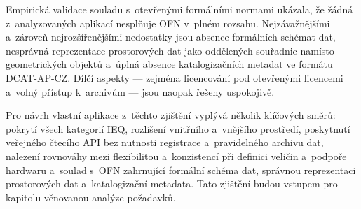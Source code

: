 Empirická validace souladu s~otevřenými formálními normami ukázala, že žádná z~analyzovaných aplikací nesplňuje OFN v~plném rozsahu. Nejzávažnějšími a~zároveň nejrozšířenějšími nedostatky jsou absence formálních schémat dat, nesprávná reprezentace prostorových dat jako oddělených souřadnic namísto geometrických objektů a~úplná absence katalogizačních metadat ve formátu DCAT-AP-CZ. Dílčí aspekty --- zejména licencování pod otevřenými licencemi a~volný přístup k~archivům --- jsou naopak řešeny uspokojivě.

Pro návrh vlastní aplikace z~těchto zjištění vyplývá několik klíčových směrů: pokrytí všech kategorií IEQ, rozlišení vnitřního a~vnějšího prostředí, poskytnutí veřejného čtecího API bez nutnosti registrace a~pravidelného archivu dat, nalezení rovnováhy mezi flexibilitou a~konzistencí při definici veličin a~podpoře hardwaru a~soulad s~OFN zahrnující formální schéma dat, správnou reprezentaci prostorových dat a~katalogizační metadata. Tato zjištění budou vstupem pro kapitolu věnovanou analýze požadavků.
